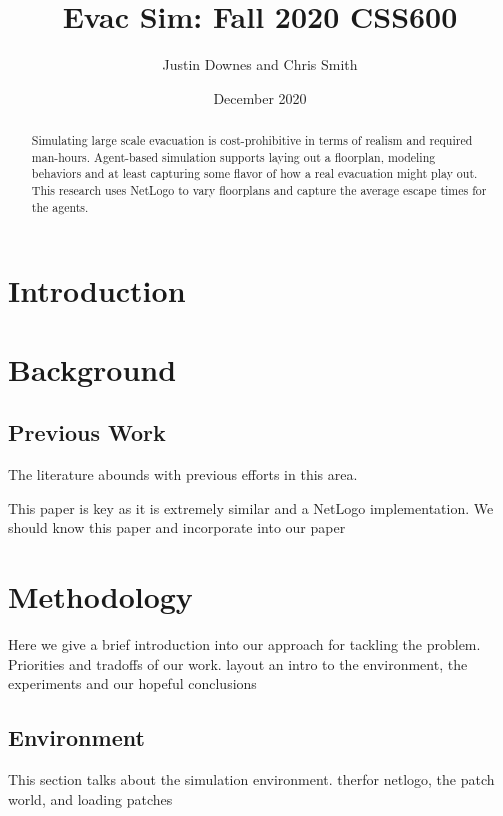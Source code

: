 \documentclass[12pt,letterpaper]{article}
\begin{document}
\title{Evac Sim: Fall 2020 CSS600 }

\author{Justin Downes and Chris Smith}
\date{December 2020}
\maketitle

\begin{abstract}
Simulating large scale evacuation is cost-prohibitive in terms of realism and
required man-hours. Agent-based simulation supports laying out a floorplan,
modeling behaviors and at least capturing some flavor of how a real evacuation
might play out. This research uses NetLogo to vary floorplans and capture the
average escape times for the agents.
\end{abstract}
\section {Introduction}
\section {Background}
\subsection{Previous Work}
The literature abounds with previous efforts in this area.
\cite{almeidaCrowdSimulationModeling2013} 
\cite{kneidl}
\cite{kuligowskil}
\cite{abmEvac}
\cite{zhouSimulationPedestrianEvacuation2019}

This paper is key as it is extremely similar and a NetLogo implementation.  We should know this paper and incorporate into our paper \cite{prioritEvac}

\section {Methodology}

Here we give a brief introduction into our approach for tackling the problem.  Priorities and tradoffs of our work. layout an intro to the environment, the experiments and our hopeful conclusions

\subsection{Environment}
This section talks about the simulation environment.  therfor netlogo, the patch world, and loading patches
\end{document}
